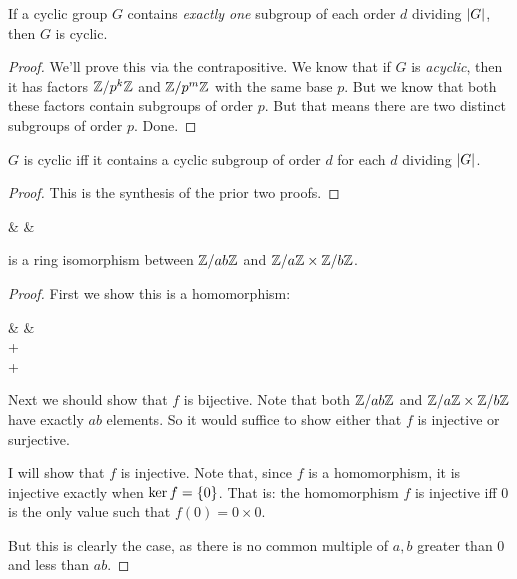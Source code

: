 \begin{proposition}
  If a cyclic group $G$ contains \emph{exactly one} subgroup of each
  order $d$ dividing $|G|$, then $G$ is cyclic.
\end{proposition}

\begin{proof}
  We'll prove this via the contrapositive. We know that if $G$ is
  \emph{acyclic}, then it has factors $\mathbb{Z} / p^k\mathbb{Z}$ and $\mathbb{Z} / p^m\mathbb{Z}$ with
  the same base $p$. But we know that both these factors contain
  subgroups of order $p$. But that means there are two distinct
  subgroups of order $p$. Done.
\end{proof}

\begin{theorem}
  $G$ is cyclic iff it contains a cyclic subgroup of order $d$ for each
  $d$ dividing $|G|$.
\end{theorem}

\begin{proof}
  This is the synthesis of the prior two proofs.
\end{proof}

\begin{theorem}
  \begin{nedqn}
  & \mapsto &
     \times {}
  \end{nedqn}

  \noindent
  is a ring isomorphism between $\mathbb{Z} / ab\mathbb{Z}$ and $\mathbb{Z} / a\mathbb{Z} \times \mathbb{Z} / b\mathbb{Z}$.
\end{theorem}

\begin{proof}
  First we show this is a homomorphism:

  \begin{nedqn}
  & \mapsto &
     \times {}
  \\
  \eqcol
     \times {}
    +
     \times {}
  \\
  \eqcol
     + 
  \end{nedqn}

  Next we should show that $f$ is bijective. Note that both $\mathbb{Z} / ab\mathbb{Z}$
  and $\mathbb{Z} / a\mathbb{Z} \times \mathbb{Z} / b\mathbb{Z}$ have exactly $ab$ elements. So it would
  suffice to show either that $f$ is injective or surjective.

  I will show that $f$ is injective. Note that, since $f$ is a
  homomorphism, it is injective exactly when $\ker f = \left\{ 0 \right\}$. That
  is: the homomorphism $f$ is injective iff $0$ is the only value such
  that $f(0) = 0 \times 0$.

  But this is clearly the case, as there is no common multiple of $a, b$
  greater than $0$ and less than $ab$.
\end{proof}

